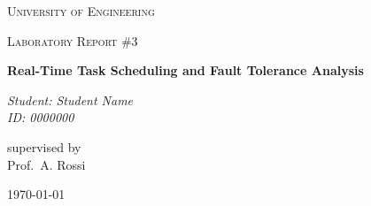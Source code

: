 \documentclass[12pt,a4paper]{article}
\begin{document}
\begin{titlepage}
    \centering
    {\scshape\LARGE University of Engineering \par}
    \vspace{1.5cm}
    {\scshape\Large Laboratory Report \#3\par}
    \vspace{1cm}
    {\huge\bfseries Real-Time Task Scheduling and Fault Tolerance Analysis \par}
    \vspace{2cm}
    {\Large\itshape Student: Student Name\\ ID: 0000000\par}
    \vfill
    supervised by\\
    Prof.~A. Rossi
    \vfill
    {\large \today\par}
\end{titlepage}
\end{document}
